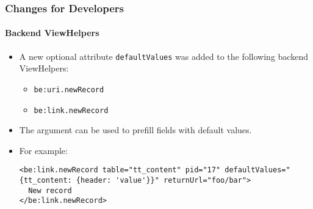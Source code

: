%

\begin{frame}[fragile]
	\frametitle{Changes for Developers}
	\framesubtitle{Backend ViewHelpers}

	\lstset{basicstyle=\tiny\ttfamily}

	\begin{itemize}
		\item A new optional attribute \texttt{defaultValues} was added to the following
			backend ViewHelpers:

			\begin{itemize}\smaller
				\item \texttt{be:uri.newRecord}
				\item \texttt{be:link.newRecord}
			\end{itemize}\normalsize

		\item The argument can be used to prefill fields with default values.
		\item For example:
\begin{lstlisting}
<be:link.newRecord table="tt_content" pid="17" defaultValues="{tt_content: {header: 'value'}}" returnUrl="foo/bar">
  New record
</be:link.newRecord>
\end{lstlisting}
	\end{itemize}

\end{frame}

